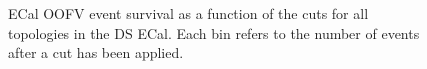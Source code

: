 \begin{figure}
\begin{minipage}{.5\linewidth}
\end{minipage}%
\begin{minipage}{.5\linewidth}
\centering
{}
\end{minipage}\par\medskip
\caption{ECal OOFV event survival as a function of the cuts for all topologies in the DS ECal.  Each bin refers to the number of events after a cut has been applied.}
\label{fig:SelOOFVEventSurvivalDS}
\end{figure}
\newline
\newline
